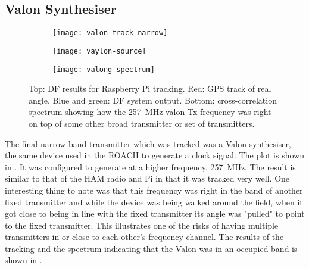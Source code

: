 \subsection{Valon Synthesiser}
\begin{figure}
  \centering
  \vspace{4em}
  \begin{subfigure}[b]{0.77\textwidth}
    \centering
    \texttt{[image: valon-track-narrow]}
  \end{subfigure}
  \begin{subfigure}[b]{0.22\textwidth}
    \centering
    \texttt{[image: vaylon-source]}
    \vspace{2em}
  \end{subfigure}
  \vspace{4em}
  \begin{subfigure}[b]{\textwidth}
    \centering
    \texttt{[image: valong-spectrum]}
  \end{subfigure}
  \caption{Top: DF results for Raspberry Pi tracking. Red: GPS track of real angle. Blue and green: DF system output. Bottom: cross-correlation spectrum showing how the \SI{257}{\mega\hertz} valon Tx frequency was right on top of some other broad transmitter or set of transmitters.}
  \label{fig:field-trials:valon-source}
\end{figure}

The final narrow-band transmitter which was tracked was a Valon synthesiser, the same device used in the ROACH to generate a clock signal. The plot is shown in . It was configured to generate at a higher frequency, \SI{257}{\mega\hertz}. The result is similar to that of the HAM radio and Pi in that it was tracked very well. One interesting thing to note was that this frequency was right in the band of another fixed transmitter and while the device was being walked around the field, when it got close to being in line with the fixed transmitter its angle was "pulled" to point to the fixed transmitter. This illustrates one of the risks of having multiple transmitters in or close to each other's frequency channel. The results of the tracking and the spectrum indicating that the Valon was in an occupied band is shown in .

